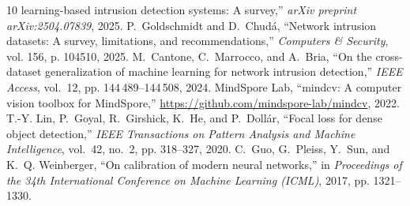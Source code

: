 \documentclass[conference]{IEEEtran} \IEEEoverridecommandlockouts
\begin{document}
\begin{thebibliography}{10}
  learning-based intrusion detection systems: A survey,'' \emph{arXiv preprint
  arXiv:2504.07839}, 2025.
P.~Goldschmidt and D.~Chud{\'a}, ``Network intrusion datasets: A survey,
  limitations, and recommendations,'' \emph{Computers \& Security}, vol. 156,
  p. 104510, 2025.
M.~Cantone, C.~Marrocco, and A.~Bria, ``On the cross-dataset generalization of
  machine learning for network intrusion detection,'' \emph{IEEE Access},
  vol.~12, pp. 144\,489--144\,508, 2024.
{MindSpore Lab}, ``{mindcv}: A computer vision toolbox for {MindSpore},''
  \url{https://github.com/mindspore-lab/mindcv}, 2022.
T.-Y. Lin, P.~Goyal, R.~Girshick, K.~He, and P.~Doll{\'a}r, ``Focal loss for
  dense object detection,'' \emph{IEEE Transactions on Pattern Analysis and
  Machine Intelligence}, vol.~42, no.~2, pp. 318--327, 2020.
C.~Guo, G.~Pleiss, Y.~Sun, and K.~Q. Weinberger, ``On calibration of modern
  neural networks,'' in \emph{Proceedings of the 34th International Conference
  on Machine Learning (ICML)}, 2017, pp. 1321--1330.
\end{thebibliography}
\end{document}
